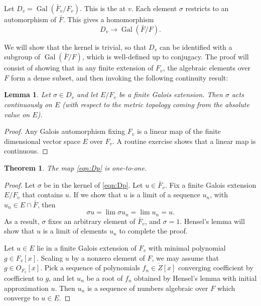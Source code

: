 \documentclass{amsart}
\newtheorem{theorem}[equation]{Theorem}
\newtheorem{lemma}[equation]{Lemma}
\def\op#1{{\operatorname{#1}}}
\def\oG{\op{Gal}}
\begin{document}
Let $D_v = \oG(\bar{F}_v/F_v)$.  This is the
 at $v$.  Each element $\sigma$ restricts
to an automorphism of $\bar{F}$.  This gives a homomorphism
\begin{equation}\label{eqn:Dp}
D_v\to \oG(\bar{F}/F).
\end{equation}

We will show that the kernel is trivial, so that $D_v$ can be
identified with a subgroup of $\oG(\bar{F}/F)$,
which is well-defined up to conjugacy.  The proof will consist of
showing that in any finite extension of $F_v$, the algebraic
elements over $F$ form a dense subset, and then invoking the
following continuity result:

\begin{lemma} Let $\sigma\in D_v$ and let $E/F_v$ be a finite Galois extension. 
Then $\sigma$ acts continuously on $E$ (with respect to the metric topology coming
from the absolute value on $E$).
\end{lemma}

\begin{proof}  Any Galois automorphism fixing $F_v$ is a linear map of
the finite dimensional vector space $E$ over $F_v$.  A routine exercise
shows that a linear map is continuous.
\end{proof}

\begin{theorem} The map \eqref{eqn:Dp} is one-to-one.
\end{theorem}

\begin{proof}
  Let $\sigma$ be in the kernel of \eqref{eqn:Dp}.  Let $u\in
  \bar{F}_v$.  Fix a finite Galois extension $E/F_v$
  that contains $u$.  If we show that $u$ is a limit of a sequence
  $u_n$, with $u_n\in E\cap \bar{F}$, then
\[
\sigma u = \lim \sigma u_n = \lim u_n = u.
\]
As a result, $\sigma$ fixes an arbitrary element of
$\bar{F}_v$, and $\sigma=1$.  Hensel's lemma will show
that $u$ is a limit of elements $u_n$ to complete the proof.


Let $u\in E$ lie in a finite Galois
extension of $F_v$ with minimal polynomial $g\in F_v[x]$.  Scaling
$u$ by a nonzero element of $F$, we may assume that $g\in O_{F_v}[x]$.  Pick a sequence
of polynomials $f_n\in\ring{Z}[x]$ converging coefficient by coefficient to 
$g$, and let $u_n$ be a root of $f_n$ obtained by Hensel's lemma with initial
approximation $u$.  Then $u_n$ is a sequence of numbers algebraic over $F$
which converge to $u\in E$.
\end{proof}
\end{document}
